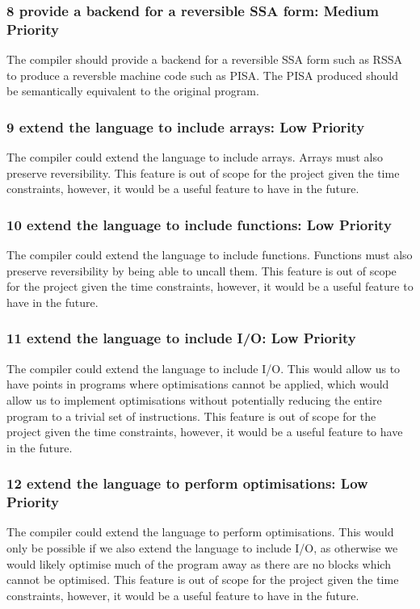 \subsubsection[8]{8 provide a backend for a reversible SSA form: Medium Priority}
The compiler should provide a backend for a reversible SSA form such as RSSA to produce a reversble machine code such as PISA.
The PISA produced should be semantically equivalent to the original program.

\subsubsection[9]{9 extend the language to include arrays: Low Priority}
The compiler could extend the language to include arrays.
Arrays must also preserve reversibility.
This feature is out of scope for the project given the time constraints, however, it would be a useful feature to have in the future.

\subsubsection[10]{10 extend the language to include functions: Low Priority}
The compiler could extend the language to include functions.
Functions must also preserve reversibility by being able to uncall them.
This feature is out of scope for the project given the time constraints, however, it would be a useful feature to have in the future.

\subsubsection[11]{11 extend the language to include I/O: Low Priority}
The compiler could extend the language to include I/O.
This would allow us to have points in programs where optimisations cannot be applied, which would allow us to implement optimisations without potentially reducing the entire program to a trivial set of instructions.
This feature is out of scope for the project given the time constraints, however, it would be a useful feature to have in the future.

\subsubsection[12]{12 extend the language to perform optimisations: Low Priority}
The compiler could extend the language to perform optimisations.
This would only be possible if we also extend the language to include I/O, as otherwise we would likely optimise much of the program away as there are no blocks which cannot be optimised.
This feature is out of scope for the project given the time constraints, however, it would be a useful feature to have in the future.

